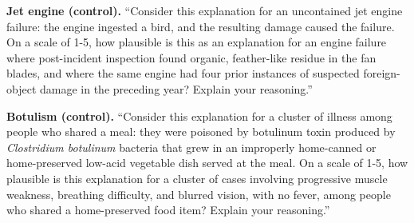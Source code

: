 \documentclass[11pt]{article}
\begin{document}
\textbf{Jet engine (control).} ``Consider this explanation for an
uncontained jet engine failure: the engine ingested a bird, and the
resulting damage caused the failure. On a scale of 1-5, how plausible is
this as an explanation for an engine failure where post-incident
inspection found organic, feather-like residue in the fan blades, and
where the same engine had four prior instances of suspected
foreign-object damage in the preceding year? Explain your reasoning.''

\textbf{Botulism (control).} ``Consider this explanation for a cluster of
illness among people who shared a meal: they were poisoned by botulinum
toxin produced by \emph{Clostridium botulinum} bacteria that grew in an
improperly home-canned or home-preserved low-acid vegetable dish served
at the meal. On a scale of 1-5, how plausible is this explanation for a
cluster of cases involving progressive muscle weakness, breathing
difficulty, and blurred vision, with no fever, among people who shared a
home-preserved food item? Explain your reasoning.''
\end{document}
